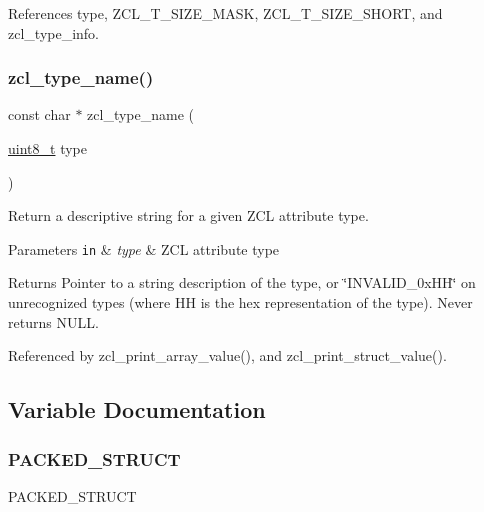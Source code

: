 References type, Z\+C\+L\+\_\+\+T\+\_\+\+S\+I\+Z\+E\+\_\+\+M\+A\+SK, Z\+C\+L\+\_\+\+T\+\_\+\+S\+I\+Z\+E\+\_\+\+S\+H\+O\+RT, and zcl\+\_\+type\+\_\+info.

\mbox{\label{group__zcl__types_ga798e87a8b8f240a33706b7bc37c9ede1}} 
\subsubsection{\texorpdfstring{zcl\+\_\+type\+\_\+name()}{zcl\_type\_name()}}
{\footnotesize\ttfamily const char $\ast$ zcl\+\_\+type\+\_\+name (\begin{DoxyParamCaption}\item[{\hyperlink{group__hal__dos_gae1affc9ca37cfb624959c866a73f83c2}{uint8\+\_\+t}}]{type }\end{DoxyParamCaption})}



Return a descriptive string for a given Z\+CL attribute type. 


\begin{DoxyParams}[1]{Parameters}
\mbox{\tt in}  & {\em type} & Z\+CL attribute type\\
\hline
\end{DoxyParams}
\begin{DoxyReturn}{Returns}
Pointer to a string description of the type, or \char`\"{}\+I\+N\+V\+A\+L\+I\+D\+\_\+0x\+H\+H\char`\"{} on unrecognized types (where HH is the hex representation of the type). Never returns N\+U\+LL. 
\end{DoxyReturn}


Referenced by zcl\+\_\+print\+\_\+array\+\_\+value(), and zcl\+\_\+print\+\_\+struct\+\_\+value().



\subsection{Variable Documentation}
\mbox{\label{group__zcl__types_ga5d86508e715769ce35a4845ed5f8f252}} 
\subsubsection{\texorpdfstring{P\+A\+C\+K\+E\+D\+\_\+\+S\+T\+R\+U\+CT}{PACKED\_STRUCT}\hspace{0.1cm}{\footnotesize\ttfamily [1/2]}}
{\footnotesize\ttfamily P\+A\+C\+K\+E\+D\+\_\+\+S\+T\+R\+U\+CT}

